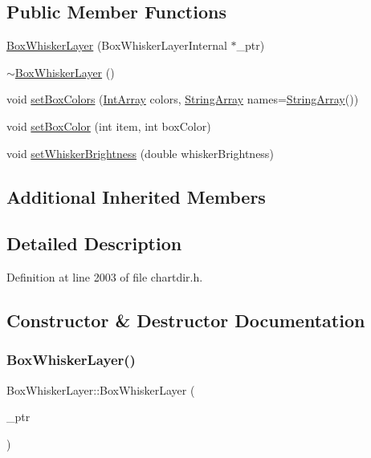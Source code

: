 \subsection*{Public Member Functions}
\begin{DoxyCompactItemize}
\item 
\hyperlink{class_box_whisker_layer_a7ee9577195e8aa0a57140afa8743e0aa}{Box\+Whisker\+Layer} (Box\+Whisker\+Layer\+Internal $\ast$\+\_\+ptr)
\item 
\hyperlink{class_box_whisker_layer_a7610db0d4d0899bb743f92d05b563bc5}{$\sim$\+Box\+Whisker\+Layer} ()
\item 
void \hyperlink{class_box_whisker_layer_ac8e09d31247ba6751447d3ea2254744c}{set\+Box\+Colors} (\hyperlink{class_int_array}{Int\+Array} colors, \hyperlink{class_string_array}{String\+Array} names=\hyperlink{class_string_array}{String\+Array}())
\item 
void \hyperlink{class_box_whisker_layer_a5112e86b72df00f7189b56bbe795d40e}{set\+Box\+Color} (int item, int box\+Color)
\item 
void \hyperlink{class_box_whisker_layer_a352ca63547e3faaa3491ba955ce64ea8}{set\+Whisker\+Brightness} (double whisker\+Brightness)
\end{DoxyCompactItemize}
\subsection*{Additional Inherited Members}


\subsection{Detailed Description}


Definition at line 2003 of file chartdir.\+h.



\subsection{Constructor \& Destructor Documentation}
\mbox{\label{class_box_whisker_layer_a7ee9577195e8aa0a57140afa8743e0aa}} 
\subsubsection{\texorpdfstring{Box\+Whisker\+Layer()}{BoxWhiskerLayer()}}
{\footnotesize\ttfamily Box\+Whisker\+Layer\+::\+Box\+Whisker\+Layer (\begin{DoxyParamCaption}\item[{Box\+Whisker\+Layer\+Internal $\ast$}]{\+\_\+ptr }\end{DoxyParamCaption})\hspace{0.3cm}{\ttfamily [inline]}}



